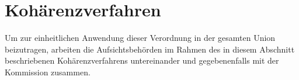 \chapter{Kohärenzverfahren}
\label{ch:63}


Um zur einheitlichen Anwendung dieser Verordnung in der gesamten Union beizutragen, arbeiten die Aufsichtsbehörden im
Rahmen des in diesem Abschnitt beschriebenen Kohärenzverfahrens untereinander und gegebenenfalls mit der Kommission
zusammen.



